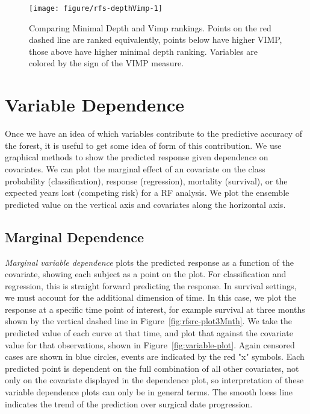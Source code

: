\documentclass[nojss]{jss}\usepackage[]{graphicx}\usepackage[]{color}
\begin{document}
\begin{Schunk}
\begin{figure}[!htpb]

{\centering \texttt{[image: figure/rfs-depthVimp-1]} 

}

\caption[Comparing Minimal Depth and Vimp rankings]{Comparing Minimal Depth and Vimp rankings. Points on the red dashed line are ranked equivalently, points below have higher VIMP, those above have higher minimal depth ranking. Variables are colored by the sign of the VIMP measure.\label{fig:depthVimp}}
\end{figure}
\end{Schunk}

\section{Variable Dependence}\label{S:dependence}
Once we have an idea of which variables contribute to the predictive accuracy of the forest, it is useful to get some idea of form of this contribution. We use graphical methods to show the predicted response given dependence on covariates. We can plot the marginal effect of an covariate on the class probability (classification), response (regression), mortality (survival), or the expected years lost (competing risk) for a RF analysis. We plot the ensemble predicted value on the vertical axis and covariates along the horizontal axis.

\subsection{Marginal Dependence}\label{S:variableDependence}
\emph{Marginal variable dependence} plots the predicted response as a function of the covariate, showing each subject as a point on the plot. For classification and regression, this is straight forward predicting the response. In survival settings, we must account for the additional dimension of time. In this case, we plot the response at a specific time point of interest, for example survival at three months shown by the vertical dashed line in Figure~\ref{fig:rfsrc-plot3Mnth}. We take the predicted value of each curve at that time, and plot that against the covariate value for that observations, shown in Figure~\ref{fig:variable-plot}. Again censored cases are shown in blue circles, events are indicated by the red "x" symbols. Each predicted point is dependent on the full combination of all other covariates, not only on the covariate displayed in the dependence plot, so interpretation of these variable dependence plots can only be in general terms. The smooth loess line~\citep{cleveland:1981, cleveland:1988} indicates the trend of the prediction over surgical date progression.
\end{document}
